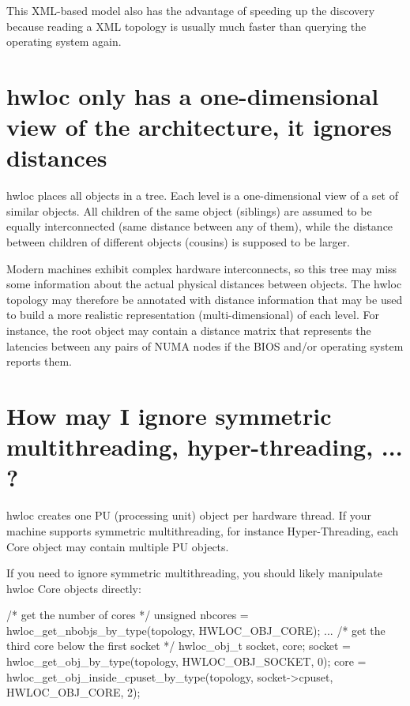 This XML-\/based model also has the advantage of speeding up the discovery because reading a XML topology is usually much faster than querying the operating system again.\hypertarget{a00011_faq_onedim}{}\section{hwloc only has a one-\/dimensional view of the architecture, it ignores distances}\label{a00011_faq_onedim}
hwloc places all objects in a tree. Each level is a one-\/dimensional view of a set of similar objects. All children of the same object (siblings) are assumed to be equally interconnected (same distance between any of them), while the distance between children of different objects (cousins) is supposed to be larger.

Modern machines exhibit complex hardware interconnects, so this tree may miss some information about the actual physical distances between objects. The hwloc topology may therefore be annotated with distance information that may be used to build a more realistic representation (multi-\/dimensional) of each level. For instance, the root object may contain a distance matrix that represents the latencies between any pairs of NUMA nodes if the BIOS and/or operating system reports them.\hypertarget{a00011_faq_smt}{}\section{How may I ignore symmetric multithreading, hyper-\/threading, ... ?}\label{a00011_faq_smt}
hwloc creates one PU (processing unit) object per hardware thread. If your machine supports symmetric multithreading, for instance Hyper-\/Threading, each Core object may contain multiple PU objects. 


If you need to ignore symmetric multithreading, you should likely manipulate hwloc Core objects directly: \begin{DoxyVerb}
/* get the number of cores */
unsigned nbcores = hwloc_get_nbobjs_by_type(topology, HWLOC_OBJ_CORE);
...
/* get the third core below the first socket */
hwloc_obj_t socket, core;
socket = hwloc_get_obj_by_type(topology, HWLOC_OBJ_SOCKET, 0);
core = hwloc_get_obj_inside_cpuset_by_type(topology, socket->cpuset,
                                           HWLOC_OBJ_CORE, 2);
\end{DoxyVerb}


